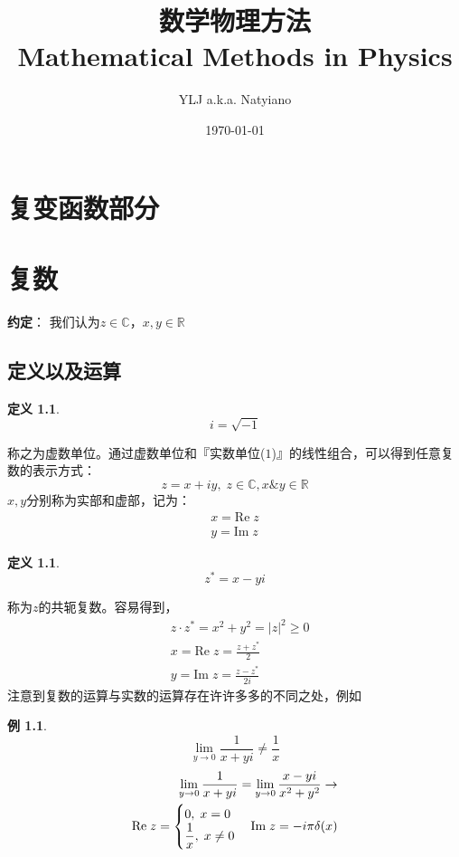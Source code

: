 \documentclass[10pt, a4paper, oneside]{ctexbook}
\title{{\Huge{\textbf{数学物理方法}}}\\Mathematical Methods in Physics}
\author{YLJ a.k.a. Natyiano}
\date{\today}
\newtheorem{definition}[theorem]{定义}
\newtheorem{example}[theorem]{例}
\begin{document}
\maketitle

\setcounter{page}{1}
\newpage
{}
\setcounter{page}{1}
\tableofcontents
\newpage
\setcounter{page}{1}

\chapter*{复变函数部分}
\chapter{复数}
\textbf{约定}：
我们认为$z\in \mathbb{C}$，$x,y \in \mathbb{R}$
\section{定义以及运算}

\begin{definition}
    $$i=\sqrt{-1}$$
\end{definition}
称之为虚数单位。通过虚数单位和『实数单位($1$)』的线性组合，可以得到任意复数的表示方式：
$$z=x+iy,\;z\in \mathbb{C}, x\&y \in \mathbb{R}$$
$x,y$分别称为实部和虚部，记为：
\begin{align*}
    x=\text{Re}\;z\\y=\text{Im}\;z
\end{align*}
\begin{definition}
    $$z^*=x-yi$$
\end{definition}
称为$z$的共轭复数。容易得到，
\begin{align*}
    &z\cdot z^*=x^2+y^2=|z|^2 \ge 0 \\
    &x=\text{Re}\;z=\frac{z+z^*}{2} \\
    &y=\text{Im}\;z=\frac{z-z^*}{2i}
\end{align*}
注意到复数的运算与实数的运算存在许许多多的不同之处，例如
\begin{example}
    $$\lim_{y\to0}\frac{1}{x+yi}\ne \frac{1}{x}$$
    \begin{align*}
    \lim_{y\to0}\frac{1}{x+yi}=\lim_{y\to0}\frac{x-yi}{x^2+y^2}\to\\ \text{\rm Re} \;z= \begin{cases}
        0,\;x=0\\\displaystyle \frac{1}{x},\; x\ne 0
    \end{cases}\text{\rm Im} \;z= -i\pi \delta(x)
    \end{align*}
\end{example}
\end{document}
